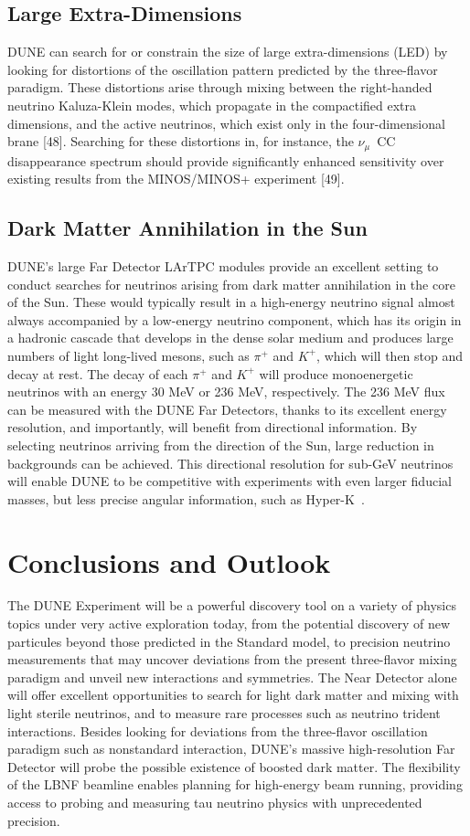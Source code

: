\subsection{Large Extra-Dimensions}
DUNE can search for or constrain the size of large extra-dimensions (LED) by looking for distortions of the oscillation pattern predicted by the three-flavor paradigm. These distortions arise through mixing between the right-handed neutrino Kaluza-Klein modes, which propagate in the compactified extra dimensions, and the active neutrinos, which exist only in the four-dimensional brane [48]. Searching for these distortions in, for instance, the $\nu_\mu$~CC disappearance spectrum should provide significantly enhanced sensitivity over existing results from the MINOS/MINOS+ experiment [49].

\subsection{Dark Matter Annihilation in the Sun}
DUNE's large Far Detector LArTPC modules provide an excellent setting to conduct searches for neutrinos arising from dark matter annihilation in the core of the Sun. These would typically result in a high-energy neutrino signal almost always accompanied by a low-energy neutrino component, which has its origin in a hadronic cascade that
develops in the dense solar medium and produces large numbers of light long-lived mesons, such as $\pi^+$ and $K^+$, which will then stop and decay at rest. The decay of each $\pi^+$ and $K^+$ will
produce monoenergetic neutrinos with an energy 30 MeV or 236 MeV, respectively.
The 236 MeV flux can be measured with the DUNE Far Detectors, thanks to its excellent energy resolution, and importantly, will benefit from directional information. By selecting neutrinos arriving from the direction of the Sun, large reduction in backgrounds can be achieved.
This directional resolution for sub-GeV neutrinos will enable DUNE to be competitive with experiments with even larger fiducial masses, but less precise angular information, such as Hyper-K~\cite{ref:DMannihilation}.

\section{Conclusions and Outlook}
The DUNE Experiment will be a powerful discovery tool on a variety of physics topics under very active exploration today, from the potential discovery of new particules beyond those predicted in the Standard model, to precision neutrino measurements that may uncover deviations from the present three-flavor mixing paradigm and unveil new interactions and symmetries.
The Near Detector alone will offer excellent opportunities to search for light dark matter and mixing with light sterile neutrinos, and to measure rare processes such as neutrino trident interactions. Besides looking for deviations from the three-flavor oscillation paradigm such as nonstandard interaction, DUNE's massive high-resolution Far Detector will probe  the possible existence of boosted dark matter. The flexibility of the LBNF beamline enables planning for high-energy beam running, providing access to probing and measuring tau neutrino physics with unprecedented precision.


